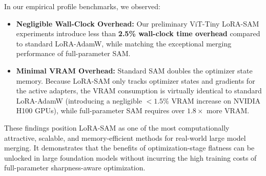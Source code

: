 In our empirical profile benchmarks, we observed:
\begin{itemize}
  \item \textbf{Negligible Wall-Clock Overhead:} Our preliminary ViT-Tiny LoRA-SAM experiments introduce less than \textbf{2.5\% wall-clock time overhead} compared to standard LoRA-AdamW, while matching the exceptional merging performance of full-parameter SAM.
  \item \textbf{Minimal VRAM Overhead:} Standard SAM doubles the optimizer state memory. Because LoRA-SAM only tracks optimizer states and gradients for the active adapters, the VRAM consumption is virtually identical to standard LoRA-AdamW (introducing a negligible $<1.5\%$ VRAM increase on NVIDIA H100 GPUs), while full-parameter SAM requires over $1.8\times$ more VRAM.
\end{itemize}
These findings position LoRA-SAM as one of the most computationally attractive, scalable, and memory-efficient methods for real-world large model merging. It demonstrates that the benefits of optimization-stage flatness can be unlocked in large foundation models without incurring the high training costs of full-parameter sharpness-aware optimization.
